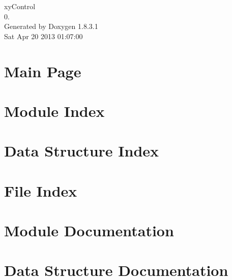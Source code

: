 \documentclass{book}
\begin{document}
\hypersetup{pageanchor=false,citecolor=blue}
\begin{titlepage}
\vspace*{7cm}
\begin{center}
{\Large xy\-Control \\[1ex]\large 0. }\\
\vspace*{1cm}
{\large Generated by Doxygen 1.8.3.1}\\
\vspace*{0.5cm}
{\small Sat Apr 20 2013 01:07:00}\\
\end{center}
\end{titlepage}
\clearemptydoublepage
{}
\tableofcontents
\clearemptydoublepage
{}
\hypersetup{pageanchor=true,citecolor=blue}
\chapter{Main Page}
\label{index}\hypertarget{index}{}
\chapter{Module Index}

\chapter{Data Structure Index}

\chapter{File Index}

\chapter{Module Documentation}

























\chapter{Data Structure Documentation}








\end{document}
